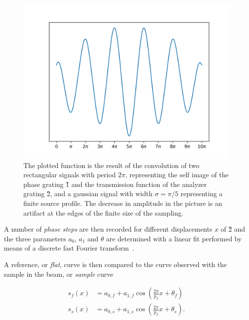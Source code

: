 \begin{figure}[htb]
    \centering
    \includegraphics[width=\textwidth]{gfx/sinusoidal-phase-stepping/sinusoidal-phase-stepping.png}
    \caption[Convolution of two rectangular and a gaussian signal.]{The
        plotted function is the result of the convolution of two rectangular
        signals with period $2\pi$, representing the self image of the phase grating \G1 and the
        transmission function of the analyzer grating \G2, and a gaussian
    signal with width $\sigma=\pi/5$ representing a finite source profile.
The decrease in amplitude in the picture is an artifact at the edges of the finite size of the sampling.}
    \label{fig:phase.stepping.sinusoidal}
\end{figure}


A number of \emph{phase steps} are then recorded for different displacements
$x$ of \G2 and the three parameters $a_0$, $a_1$ and $\theta$ are determined
with a linear fit performed by means of a discrete fast Fourier transform~\parencite{FFTEquivalence}.

A reference, or \emph{flat}, curve is then compared to the curve observed
with the sample in the beam, or \emph{sample} curve

\begin{align}
    s_f(x) &= a_{0,f} + a_{1,f} \cos\left(\frac{2 \pi}{p_2} x + \theta_{f}\right)\\
    s_s(x) &= a_{0,s} + a_{1,s} \cos\left(\frac{2 \pi}{p_2} x +
    \theta_{s}\right).
    \label{eq:flat}
\end{align}

